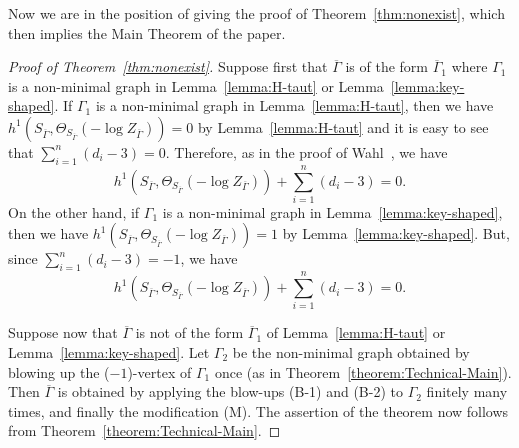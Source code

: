 \documentclass[a4paper, reqno, twoside]{amsart}
\theoremstyle{definition}
\numberwithin{equation}{section}
\begin{document}
Now we are in the position of giving the proof of Theorem~\ref{thm:nonexist},
which then implies the Main Theorem of the paper.

\begin{proof}[Proof of Theorem~\ref{thm:nonexist}]
Suppose first that $\overline{\Gamma}$ is of the form
$\overline{\Gamma}_1$ where $\Gamma_1$ is a non-minimal graph in
Lemma~\ref{lemma:H-taut} or Lemma~\ref{lemma:key-shaped}. If
$\Gamma_1$ is a non-minimal graph in Lemma~\ref{lemma:H-taut}, then we
have $h^1(S_{\overline{\Gamma}},
\Theta_{S_{\overline{\Gamma}}}(-\log{Z_{\overline{\Gamma}}})) =0$ by
Lemma~\ref{lemma:H-taut} and it is easy to see that $\sum_{i=1}^{n}
(d_i-3)=0$. Therefore, as in the proof of
Wahl~\cite[Theorem~8.6]{Wahl-2011}, we have
\begin{equation*}
h^1(S_{\overline{\Gamma}},
\Theta_{S_{\overline{\Gamma}}}(-\log{Z_{\overline{\Gamma}}})) +
\sum_{i=1}^{n} (d_i-3) = 0.
\end{equation*}
On the other hand, if $\Gamma_1$ is a non-minimal graph in Lemma~\ref{lemma:key-shaped}, then we have $h^1(S_{\overline{\Gamma}}, \Theta_{S_{\overline{\Gamma}}}(-\log{Z_{\overline{\Gamma}}})) = 1$ by Lemma~\ref{lemma:key-shaped}. But, since $\sum_{i=1}^{n} (d_i-3) = -1$, we have
\begin{equation*}
h^1(S_{\overline{\Gamma}}, \Theta_{S_{\overline{\Gamma}}}(-\log{Z_{\overline{\Gamma}}})) + \sum_{i=1}^{n} (d_i-3) = 0.
\end{equation*}

Suppose now that $\overline{\Gamma}$ is not of the form
$\overline{\Gamma}_1$ of Lemma~\ref{lemma:H-taut} or
Lemma~\ref{lemma:key-shaped}. Let $\Gamma_2$ be the non-minimal graph
obtained by blowing up the ($-1$)-vertex of $\Gamma_1$ once (as in
Theorem~\ref{theorem:Technical-Main}). Then $\overline{\Gamma}$ is
obtained by applying the blow-ups (B-1) and (B-2) to $\Gamma_2$
finitely many times, and finally the modification (M). The assertion
of the theorem now follows from Theorem~\ref{theorem:Technical-Main}.
\end{proof}
\end{document}
